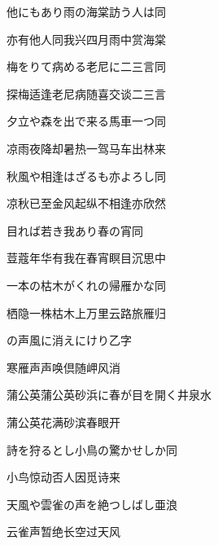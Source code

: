 \begin{haiku}
    {\FH 他にもあり雨の海棠訪う人は}\hfill{\FH 同}

    {\FK 亦有他人同我兴四月雨中赏海棠}
\end{haiku}

\begin{haiku}
    {\FH 梅をりて病める老尼に二三言}\hfill{\FH 同}

    {\FK 探梅适逢老尼病随喜交谈二三言}
\end{haiku}

\begin{haiku}
    {\FH 夕立や森を出で来る馬車一つ}\hfill{\FH 同}

    {\FK 凉雨夜降却暑热一驾马车出林来}
\end{haiku}

\begin{haiku}
    {\FH 秋風や相逢はざるも亦よろし}\hfill{\FH 同}

    {\FK 凉秋已至金风起纵不相逢亦欣然}
\end{haiku}

\begin{haiku}
    {\FH 目れば若き我あり春の宵}\hfill{\FH 同}

    {\FK 荳蔻年华有我在春宵瞑目沉思中}
\end{haiku}

\begin{haiku}
    {\FH 一本の枯木がくれの帰雁かな}\hfill{\FH 同}

    {\FK 栖隐一株枯木上万里云路旅雁归}
\end{haiku}

\begin{haiku}
    {\FH {}の声風に消えにけり}\hfill{\FH 乙字}

    {\FK 寒雁声声唤倶随岬风消}
\end{haiku}

\begin{haiku}
    {\FH 蒲公英蒲公英砂浜に春が目を開く}\hfill{\FH 井泉水}

    {\FK 蒲公英花满砂滨春眼开}
\end{haiku}

\begin{haiku}
    {\FH 詩を狩るとし小鳥の驚かせしか}\hfill{\FH 同}

    {\FK 小鸟惊动否人因觅诗来}
\end{haiku}

\begin{haiku}
    {\FH 天風や雲雀の声を絶つしばし}\hfill{\FH 亜浪}

    {\FK 云雀声暂绝长空过天风}
\end{haiku}

